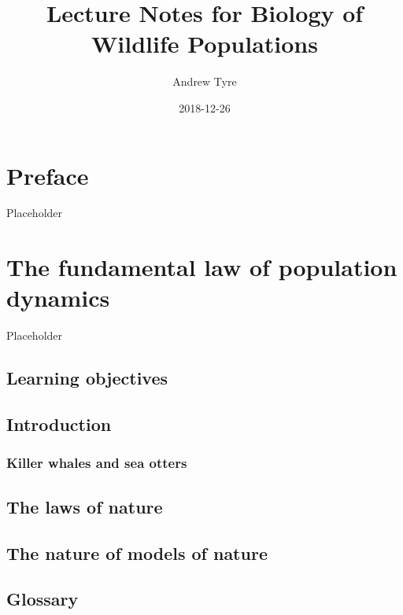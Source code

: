 \documentclass[]{book}
\title{Lecture Notes for Biology of Wildlife Populations}
\author{Andrew Tyre}
\date{2018-12-26}
\theoremstyle{definition}
\theoremstyle{definition}
\theoremstyle{definition}
\theoremstyle{remark}
\begin{document}
\maketitle

{
\setcounter{tocdepth}{1}
\tableofcontents
}
\hypertarget{preface}{%
\chapter*{Preface}\label{preface}}

Placeholder

\hypertarget{chap:fundamental}{%
\chapter{The fundamental law of population
dynamics}\label{chap:fundamental}}

Placeholder

\hypertarget{learning-objectives}{%
\section{Learning objectives}\label{learning-objectives}}

\hypertarget{introduction}{%
\section{Introduction}\label{introduction}}

\hypertarget{killer-whales-and-sea-otters}{%
\subsection{Killer whales and sea
otters}\label{killer-whales-and-sea-otters}}

\hypertarget{the-laws-of-nature}{%
\section{The laws of nature}\label{the-laws-of-nature}}

\hypertarget{the-nature-of-models-of-nature}{%
\section{The nature of models of
nature}\label{the-nature-of-models-of-nature}}

\hypertarget{glossary}{%
\section{Glossary}\label{glossary}}
\end{document}
